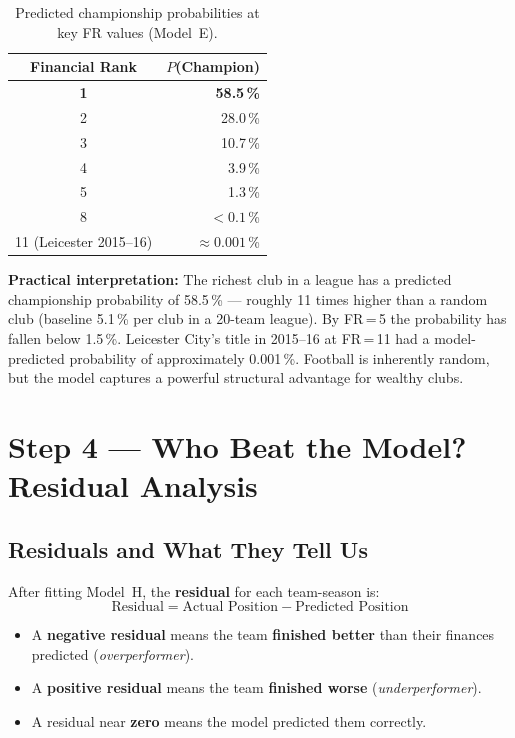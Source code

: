 \documentclass[11pt, a4paper]{article}
\begin{document}
\begin{table}[H]
  \centering
  \small
  \caption{Predicted championship probabilities at key FR values (Model~E).}
  \label{tab:probfr}
  \begin{tabular}{c r}
    \toprule
    \rowcolor{NavyBlue}
    \color{white}\textbf{Financial Rank} &
    \color{white}\textbf{$P$(Champion)} \\
    \midrule
    \rowcolor{RowB}
    \textbf{1} & \textbf{58.5\,\%} \\
    2 &  28.0\,\% \\
    3 &  10.7\,\% \\
    4 &   3.9\,\% \\
    5 &   1.3\,\% \\
    8 &   $< 0.1$\,\% \\
    11 (Leicester 2015--16) & $\approx 0.001$\,\% \\
    \bottomrule
  \end{tabular}
\end{table}

\begin{statbox}
  \textbf{Practical interpretation:} The richest club in a league has a predicted
  championship probability of 58.5\,\% --- roughly 11 times higher than a random
  club (baseline 5.1\,\% per club in a 20-team league). By FR\,=\,5 the probability
  has fallen below 1.5\,\%. Leicester City's title in 2015--16 at FR\,=\,11 had
  a model-predicted probability of approximately 0.001\,\%. Football is inherently
  random, but the model captures a powerful structural advantage for wealthy clubs.
\end{statbox}

\section{Step 4 --- Who Beat the Model? Residual Analysis}

\subsection{Residuals and What They Tell Us}

After fitting Model~H, the \textbf{residual} for each team-season is:
\[
  \text{Residual} = \text{Actual Position} - \text{Predicted Position}
\]
\begin{itemize}
  \item A \textbf{negative residual} means the team \textbf{finished better} than
        their finances predicted (\textit{overperformer}).
  \item A \textbf{positive residual} means the team \textbf{finished worse}
        (\textit{underperformer}).
  \item A residual near \textbf{zero} means the model predicted them correctly.
\end{itemize}
\end{document}
